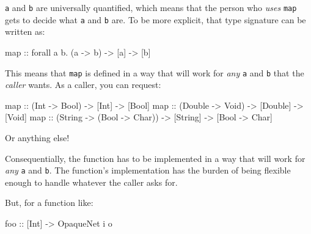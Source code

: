 \documentclass[]{article}
\newenvironment{Shaded}{}{}
\newcommand{\DataTypeTok}[1]{\textcolor[rgb]{0.56,0.13,0.00}{#1}}
\newcommand{\FunctionTok}[1]{\textcolor[rgb]{0.02,0.16,0.49}{#1}}
\newcommand{\NormalTok}[1]{#1}
\newcommand{\OtherTok}[1]{\textcolor[rgb]{0.00,0.44,0.13}{#1}}
\begin{document}
\texttt{a} and \texttt{b} are universally quantified, which means that the
person who \emph{uses} \texttt{map} gets to decide what \texttt{a} and
\texttt{b} are. To be more explicit, that type signature can be written as:

\begin{Shaded}
\begin{Highlighting}[]
\NormalTok{map}\OtherTok{ ::}\NormalTok{ forall a b}\FunctionTok{.}\NormalTok{ (a }\OtherTok{->}\NormalTok{ b) }\OtherTok{->}\NormalTok{ [a] }\OtherTok{->}\NormalTok{ [b]}
\end{Highlighting}
\end{Shaded}

This means that \texttt{map} is defined in a way that will work for \emph{any}
\texttt{a} and \texttt{b} that the \emph{caller} wants. As a caller, you can
request:

\begin{Shaded}
\begin{Highlighting}[]
\NormalTok{map}\OtherTok{ ::}\NormalTok{ (}\DataTypeTok{Int} \OtherTok{->} \DataTypeTok{Bool}\NormalTok{)    }\OtherTok{->}\NormalTok{ [}\DataTypeTok{Int}\NormalTok{]    }\OtherTok{->}\NormalTok{ [}\DataTypeTok{Bool}\NormalTok{]}
\NormalTok{map}\OtherTok{ ::}\NormalTok{ (}\DataTypeTok{Double} \OtherTok{->} \DataTypeTok{Void}\NormalTok{) }\OtherTok{->}\NormalTok{ [}\DataTypeTok{Double}\NormalTok{] }\OtherTok{->}\NormalTok{ [}\DataTypeTok{Void}\NormalTok{]}
\NormalTok{map}\OtherTok{ ::}\NormalTok{ (}\DataTypeTok{String} \OtherTok{->}\NormalTok{ (}\DataTypeTok{Bool} \OtherTok{->} \DataTypeTok{Char}\NormalTok{)) }\OtherTok{->}\NormalTok{ [}\DataTypeTok{String}\NormalTok{] }\OtherTok{->}\NormalTok{ [}\DataTypeTok{Bool} \OtherTok{->} \DataTypeTok{Char}\NormalTok{]}
\end{Highlighting}
\end{Shaded}

Or anything else!

Consequentially, the function has to be implemented in a way that will work for
\emph{any} \texttt{a} and \texttt{b}. The function's implementation has the
burden of being flexible enough to handle whatever the caller asks for.

But, for a function like:

\begin{Shaded}
\begin{Highlighting}[]
\OtherTok{foo ::}\NormalTok{ [}\DataTypeTok{Int}\NormalTok{] }\OtherTok{->} \DataTypeTok{OpaqueNet}\NormalTok{ i o}
\end{Highlighting}
\end{Shaded}
\end{document}
